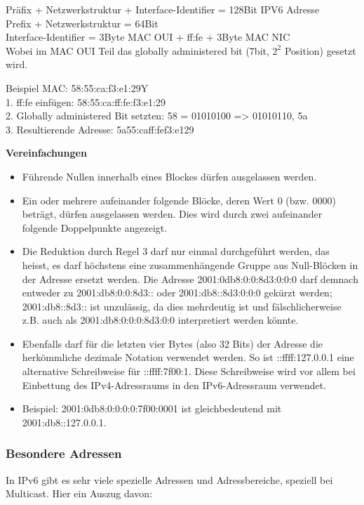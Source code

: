 Präfix + Netzwerkstruktur + Interface-Identifier = 128Bit IPV6 Adresse\\
Prefix + Netzwerkstruktur = 64Bit\\
Interface-Identifier = 3Byte MAC OUI + ff:fe + 3Byte MAC NIC\\
Wobei im MAC OUI Teil das globally administered bit (7bit, $2^{2}$ Position) gesetzt wird.

Beispiel MAC: 58:55:ca:f3:e1:29Y\\
1. ff:fe einfügen: 58:55:ca:ff:fe:f3:e1:29\\
2. Globally administered Bit setzten: 58 = 01010100 => 01010110, 5a\\
3. Resultierende Adresse: 5a55:caff:fef3:e129

\textbf{Vereinfachungen}

\begin{itemize}
	\item Führende Nullen innerhalb eines Blockes dürfen ausgelassen werden.
	\item Ein oder mehrere aufeinander folgende Blöcke, deren Wert 0 (bzw. 0000)
		beträgt, dürfen ausgelassen werden. Dies wird durch zwei aufeinander
		folgende Doppelpunkte angezeigt.
	\item Die Reduktion durch Regel 3 darf nur einmal durchgeführt werden, das
		heisst, es darf höchstens eine zusammenhängende Gruppe aus Null-Blöcken in
		der Adresse ersetzt werden. Die Adresse 2001:0db8:0:0:8d3:0:0:0 darf demnach
		entweder zu 2001:db8:0:0:8d3:: oder 2001:db8::8d3:0:0:0 gekürzt werden;
		2001:db8::8d3:: ist unzulässig, da dies mehrdeutig ist und fälschlicherweise
		z.B. auch als 2001:db8:0:0:0:8d3:0:0 interpretiert werden könnte.
	\item Ebenfalls darf für die letzten vier Bytes (also 32 Bits) der Adresse die
		herkömmliche dezimale Notation verwendet werden. So ist ::ffff:127.0.0.1
		eine alternative Schreibweise für ::ffff:7f00:1. Diese Schreibweise wird vor
		allem bei Einbettung des IPv4-Adressraums in den IPv6-Adressraum verwendet.
	\item Beispiel: 2001:0db8:0:0:0:0:7f00:0001 ist gleichbedeutend mit
		2001:db8::127.0.0.1.
\end{itemize}

\subsubsection{Besondere Adressen}

In IPv6 gibt es sehr viele spezielle Adressen und Adressbereiche, speziell bei
Multicast. Hier ein Auszug davon:

